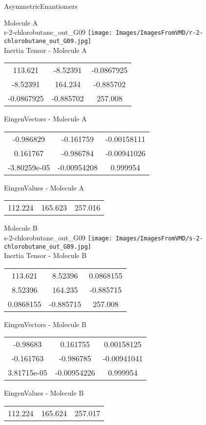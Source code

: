\vtab[-2cm]
\begin{center}
{\large AsymmetricEnantiomers}
\end{center}
\begin{multicols}{2}
\begin{center}
Molecule A \\ 
r-2-chlorobutane\_out\_G09
\texttt{[image: Images/ImagesFromVMD/r-2-chlorobutane\_out\_G09.jpg]}
\\
Inertia Tensor - Molecule A \\
\vtab
\begin{tabular}{|c c c|}
113.621	 & 	-8.52391	 & 	-0.0867925	 \\
-8.52391	 & 	164.234	 & 	-0.885702	 \\
-0.0867925	 & 	-0.885702	 & 	257.008
\end{tabular}

\vtab
 EingenVectors - Molecule A     \\
\vtab
\begin{tabular}{|c c c|}
-0.986829	 & 	-0.161759	 & 	-0.00158111	 \\
0.161767	 & 	-0.986784	 & 	-0.00941026	 \\
-3.80259e-05	 & 	-0.00954208	 & 	0.999954
\end{tabular}

\vtab
 EingenValues - Molecule A     \\
\vtab
\begin{tabular}{|c c c|}
112.224	 & 	165.623	 & 	257.016
\end{tabular}
\columnbreak

Molecule B \\ 
s-2-chlorobutane\_out\_G09
\texttt{[image: Images/ImagesFromVMD/s-2-chlorobutane\_out\_G09.jpg]}
\\
Inertia Tensor - Molecule B \\
\vtab
\begin{tabular}{|c c c|}
113.621	 & 	8.52396	 & 	0.0868155	 \\
8.52396	 & 	164.235	 & 	-0.885715	 \\
0.0868155	 & 	-0.885715	 & 	257.008
\end{tabular}

\vtab
 EingenVectors - Molecule B     \\
\vtab
\begin{tabular}{|c c c|}
-0.98683	 & 	0.161755	 & 	0.00158125	 \\
-0.161763	 & 	-0.986785	 & 	-0.00941041	 \\
3.81715e-05	 & 	-0.00954226	 & 	0.999954
\end{tabular}

\vtab
 EingenValues - Molecule B     \\
\vtab
\begin{tabular}{|c c c|}
112.224	 & 	165.624	 & 	257.017
\end{tabular}

\end{center}
\end{multicols}
